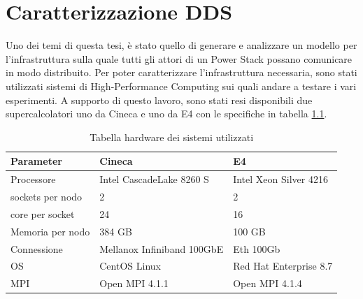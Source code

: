 \chapter{Caratterizzazione DDS}
Uno dei temi di questa tesi, è stato quello di generare e  analizzare un modello per l'infrastruttura sulla quale tutti gli attori di un Power Stack possano comunicare in modo distribuito. Per poter caratterizzare  l'infrastruttura necessaria, sono stati utilizzati sistemi di High-Performance Computing sui quali andare a testare i vari esperimenti. A supporto di questo lavoro, sono stati resi disponibili due supercalcolatori uno da Cineca\cite{Cineca} e uno da E4\cite{E4} con le specifiche in tabella \ref{table:hpc-cineca}.

\begin{table}[H]
\begin{center}
\begin{tabular}{l|l|l}
    \hline
    \textbf{Parameter} & \textbf{Cineca} & \textbf{E4} \\
    \hline
    Processore & Intel CascadeLake 8260 S & Intel Xeon Silver 4216 \\
    \hline
    [\#] sockets per nodo & 2 & 2 \\
    \hline
    [\#]  core per socket & 24 & 16 \\
    \hline
    Memoria per nodo & 384 GB & 100 GB\\
    \hline
    Connessione & Mellanox Infiniband 100GbE & Eth 100Gb\\
    \hline
    OS & CentOS Linux &  Red Hat Enterprise 8.7\\ 
    \hline
    MPI & Open MPI 4.1.1 & Open MPI 4.1.4 \\
    \hline
\end{tabular}
\end{center}
\caption{Tabella hardware dei sistemi utilizzati}
\label{table:hpc-cineca}
\end{table}


